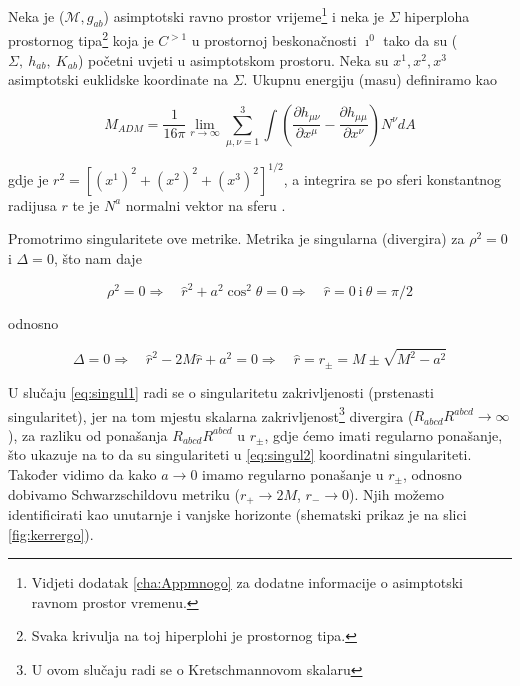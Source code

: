 \begin{mydef*}
Neka je ($\mathcal{M},g_{ab}$) asimptotski ravno prostor vrijeme\footnote{Vidjeti dodatak \ref{cha:Appmnogo} za dodatne informacije o asimptotski ravnom prostor vremenu.} i neka je $\Sigma$ hiperploha prostornog tipa\footnote{Svaka krivulja na toj hiperplohi je prostornog tipa.} koja je $C^{>1}$ u prostornoj beskonačnosti $\imath^0$ tako da su ($\Sigma,\ h_{ab},\ K_{ab}$) početni uvjeti u asimptotskom prostoru. Neka su $x^1, x^2, x^3$ asimptotski euklidske koordinate na $\Sigma$. Ukupnu energiju (masu) definiramo kao

\begin{equation}
M_{ADM}=\frac{1}{16\pi}\lim\limits_{r\to\infty}\sum_{\mu,\nu=1}^{3}\int\left(\frac{\partial h_{\mu\nu}}{\partial x^\mu}-\frac{\partial h_{\mu\mu}}{\partial x^\nu}\right)N^\nu dA
\end{equation}

\noindent gdje je $r^2=[(x^1)^2+(x^2)^2+(x^3)^2]^{1/2}$, a integrira se po sferi konstantnog radijusa $r$ te je $N^a$ normalni vektor na sferu \citep{wald2010general}.
\end{mydef*}

\newpage

Promotrimo singularitete ove metrike. Metrika je singularna (divergira) za $\rho^2=0$ i $\Delta=0$, što nam daje

\begin{equation}
\rho^2=0\Rightarrow\quad \hat{r}^2+a^2\cos^2\theta=0\Rightarrow\quad \hat{r}=0\ \textrm{i}\ \theta=\pi/2
\label{eq:singul1}
\end{equation}

\noindent odnosno

\begin{equation}
\Delta=0\Rightarrow\quad \hat{r}^2-2M\hat{r}+a^2=0\Rightarrow\quad \hat{r}=r_\pm=M\pm\sqrt{M^2-a^2} 
\label{eq:singul2}
\end{equation}

U slučaju \eqref{eq:singul1} radi se o singularitetu zakrivljenosti (prstenasti singularitet), jer na tom mjestu skalarna zakrivljenost\footnote{U ovom slučaju radi se o Kretschmannovom skalaru} divergira ($R_{abcd}R^{abcd}\to\infty$), za razliku od ponašanja $R_{abcd}R^{abcd}$ u $r_\pm$, gdje ćemo imati regularno ponašanje, što ukazuje na to da su singulariteti u \eqref{eq:singul2} koordinatni singulariteti. Također vidimo da kako $a\to 0$ imamo regularno ponašanje u $r_\pm$, odnosno dobivamo Schwarzschildovu metriku ($r_{+}\to 2M$, $r_{-}\to 0$). Njih možemo identificirati kao unutarnje i vanjske horizonte (shematski prikaz je na slici \ref{fig:kerrergo}).

